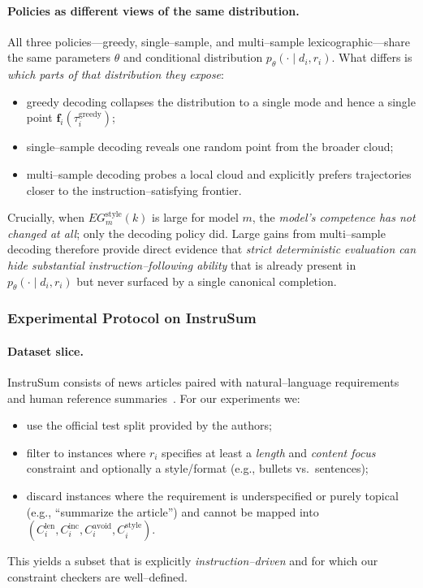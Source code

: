 \paragraph{Policies as different views of the same distribution.}
All three policies---greedy, single--sample, and multi--sample
lexicographic---share the same parameters $\theta$ and conditional
distribution $p_\theta(\cdot \mid d_i, r_i)$. What differs is
\emph{which parts of that distribution they expose}:
\begin{itemize}[leftmargin=1.5em,noitemsep]
  \item greedy decoding collapses the distribution to a single mode and
        hence a single point $\mathbf{f}_i(\tau_i^{\text{greedy}})$;
  \item single--sample decoding reveals one random point from the
        broader cloud;
  \item multi--sample decoding probes a local cloud and explicitly
        prefers trajectories closer to the instruction--satisfying
        frontier.
\end{itemize}
Crucially, when $EG^{\text{style}}_m(k)$ is large for model $m$, the
\emph{model's competence has not changed at all}; only the decoding
policy did. Large gains from multi--sample decoding therefore provide
direct evidence that \emph{strict deterministic evaluation can hide
substantial instruction--following ability} that is already present in
$p_\theta(\cdot \mid d_i, r_i)$ but never surfaced by a single canonical
completion.

\subsubsection{Experimental Protocol on InstruSum}
\label{subsubsec:style-protocol}

\paragraph{Dataset slice.}
InstruSum consists of news articles paired with natural--language
requirements and human reference summaries~\citep{liu2024instrusum}.
For our experiments we:
\begin{itemize}[leftmargin=1.5em,noitemsep]
  \item use the official test split provided by the authors;
  \item filter to instances where $r_i$ specifies at least a
        \emph{length} and \emph{content focus} constraint and
        optionally a style/format (e.g., bullets vs.\ sentences);
  \item discard instances where the requirement is underspecified or
        purely topical (e.g., ``summarize the article'') and cannot be
        mapped into $(C^{\text{len}}_i, C^{\text{inc}}_i,
        C^{\text{avoid}}_i, C^{\text{style}}_i)$.
\end{itemize}
This yields a subset that is explicitly \emph{instruction--driven} and
for which our constraint checkers are well--defined.


